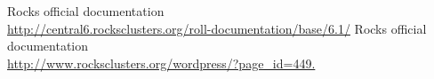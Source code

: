 \cleardoublepage
{}
{}
\begin{thebibliography}{99}

 Rocks official documentation \\ \url{http://central6.rocksclusters.org/roll-documentation/base/6.1/}
 Rocks official documentation \\ \url{http://www.rocksclusters.org/wordpress/?page_id=449.}

\end{thebibliography}

